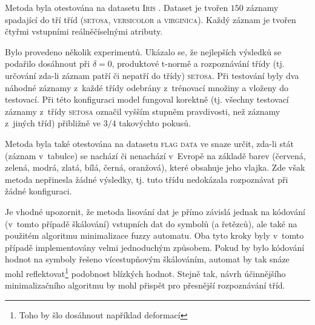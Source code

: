 Metoda byla otestována na datasetu \textsc{Iris} \cite{web-IrisDataset}. Dataset je tvořen $150$ záznamy spadající do tří tříd (\textsc{setosa}, \textsc{versicolor} a \textsc{virginica}). Každý záznam je tvořen čtyřmi vstupními reálněčíselnými atributy.

Bylo provedeno několik experimentů. Ukázalo se, že nejlepších výsledků se podařilo dosáhnout při $\delta = 0$, produktové t-normě a rozpoznávání třídy (tj. určování zda-li záznam patří či nepatří do třídy) \textsc{setosa}. Při testování byly dva náhodné záznamy z~každé třídy odebrány z~trénovací množiny a vloženy do testovací. Při této konfiguraci model fungoval korektně (tj. všechny testovací záznamy z~třídy \textsc{setosa} označil vyšším stupněm pravdivosti, než záznamy z~jiných tříd) přibližně ve $3/4$ takovýchto pokusů.

Metoda byla také otestována na datasetu \textsc{flag data} \cite{web-FlagsDataset} ve snaze určit, zda-li stát (záznam v~tabulce) se nachází či nenachází v~Evropě na základě barev (červená, zelená, modrá, zlatá, bílá, černá, oranžová), které obsahuje jeho vlajka. Zde však metoda nepřinesla žádné výsledky, tj. tuto třídu nedokázala rozpoznávat při žádné konfiguraci.

Je vhodné upozornit, že metoda lisování dat je přímo závislá jednak na kódování (v~tomto případě škálování) vstupních dat do symbolů (a řetězců), ale také na použitém algoritmu minimalizace fuzzy automatu. Oba tyto kroky byly v~tomto případě implementovány velmi jednoduchým způsobem. Pokud by bylo kódování hodnot na symboly řešeno vícestupňovým škálováním, automat by tak snáze mohl reflektovat\footnote{Toho by šlo dosáhnout například deformací } podobnost blízkých hodnot. Stejně tak, návrh účinnějšího minimalizačního algoritmu by mohl přispět pro přesnější rozpoznávání tříd.


